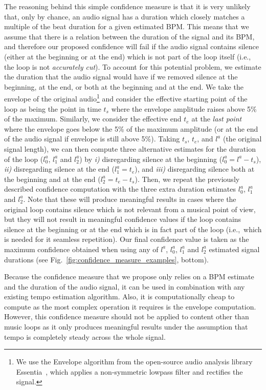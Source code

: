 \documentclass{article}
\begin{document}
The reasoning behind this simple confidence measure is that it is very unlikely that, only by chance, an audio signal has a duration which closely matches a multiple of the beat duration for a given estimated BPM. This means that we assume that there is a relation between the duration of the signal and its BPM, and therefore our proposed confidence will fail if the audio signal contains silence (either at the beginning or at the end) which is not part of the loop itself (i.e.,~ the loop is not \emph{accurately cut}).
To account for this potential problem, we estimate the duration that the audio signal would have if we removed silence at the beginning, at the end, or both at the beginning and at the end.
We take the envelope of the original audio\footnote{We use the Envelope algorithm from the open-source audio analysis library Essentia~\cite{Bogdanov2013}, which applies a non-symmetric lowpass filter and rectifies the signal.} and consider the effective starting point of the loop as being the point in time $t_s$ where the envelope amplitude raises above 5\% of the maximum.
Similarly, we consider the effective end $t_e$ at the \emph{last point} where the envelope goes below the 5\% of the maximum amplitude (or at the end of the audio signal if envelope is still above 5\%). 
Taking $t_s$, $t_e$, and $l^a$ (the original signal length), we can then compute three alternative estimates for the duration of the loop ($l_0^{a}$, $l_1^{a}$ and $l_2^{a}$) by \emph{i)} disregarding silence at the beginning ($l_0^{a} = l^a - t_s$), \emph{ii)} disregarding silence at the end ($l_1^{a} = t_e$), and \emph{iii)} disregarding silence both at the beginning and at the end ($l_2^{a} = t_e - t_s$).
Then, we repeat the previously described confidence computation with the three extra duration estimates $l_0^{a}$, $l_1^{a}$ and $l_2^{a}$. 
Note that these will produce meaningful results in cases where the original loop contains silence which is not relevant from a musical point of view, but they will not result in meaningful confidence values if the loop contains silence at the beginning or at the end which is in fact part of the loop (i.e.,~which is needed for it seamless repetition).
Our final confidence value is taken as the maximum confidence obtained when using any of $l^{a}$, $l_0^{a}$, $l_1^{a}$ and $l_2^{a}$ estimated signal durations (see Fig.~\ref{fig:confidence_measure_examples}, bottom).

Because the confidence measure that we propose only relies on a BPM estimate and the duration of the audio signal, it can be used in combination with any existing tempo estimation algorithm. Also, it is computationally cheap to compute as the most complex operation it requires is the envelope computation. However, this confidence measure should not be applied to content other than music loops as it only produces meaningful results under the assumption that tempo is completely steady across the whole signal.
\end{document}
